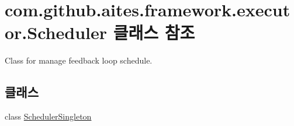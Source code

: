 \hypertarget{classcom_1_1github_1_1aites_1_1framework_1_1executor_1_1_scheduler}{}\section{com.\+github.\+aites.\+framework.\+executor.\+Scheduler 클래스 참조}
\label{classcom_1_1github_1_1aites_1_1framework_1_1executor_1_1_scheduler}


Class for manage feedback loop schedule.  


\subsection*{클래스}
\begin{DoxyCompactItemize}
\item 
class \mbox{\hyperlink{classcom_1_1github_1_1aites_1_1framework_1_1executor_1_1_scheduler_1_1_scheduler_singleton}{Scheduler\+Singleton}}
\end{DoxyCompactItemize}
